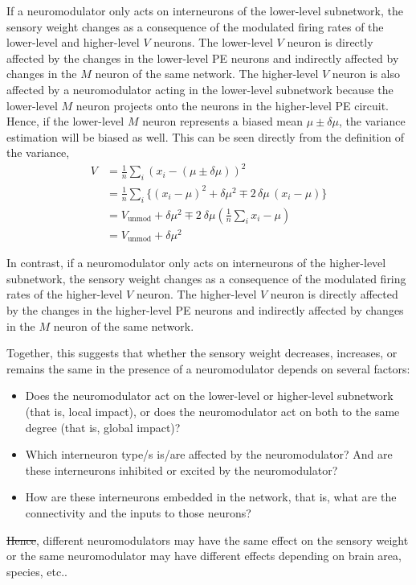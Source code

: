 \documentclass[10pt,a4paper]{article}
\providecommand{\DIFaddtex}[1]{{\protect\color{blue}\uwave{#1}}} %
\providecommand{\DIFdeltex}[1]{{\protect\color{red}\sout{#1}}}                      %
\providecommand{\DIFaddbegin}{} %
\providecommand{\DIFaddend}{} %
\providecommand{\DIFdelbegin}{} %
\providecommand{\DIFdelend}{} %
\providecommand{\DIFadd}[1]{\texorpdfstring{\DIFaddtex{#1}}{#1}} %
\providecommand{\DIFdel}[1]{\texorpdfstring{\DIFdeltex{#1}}{}} %
\newcommand{\DIFscaledelfig}{0.5}
\newlength{\DIFdelgraphicswidth} %
\newlength{\DIFdelgraphicsheight} %
\newcommand{\DIFaddincludegraphics}[2][]{{\color{blue}\fbox{\DIFOincludegraphics[#1]{#2}}}} %
\newcommand{\DIFdelincludegraphics}[2][]{%
\sbox{\DIFdelgraphicsbox}{\DIFOincludegraphics[#1]{#2}}%
\settoboxwidth{\DIFdelgraphicswidth}{\DIFdelgraphicsbox} %
\settoboxtotalheight{\DIFdelgraphicsheight}{\DIFdelgraphicsbox} %
\scalebox{\DIFscaledelfig}{%
\parbox[b]{\DIFdelgraphicswidth}{\usebox{\DIFdelgraphicsbox}\\[-\baselineskip] \rule{\DIFdelgraphicswidth}{0em}}\llap{\resizebox{\DIFdelgraphicswidth}{\DIFdelgraphicsheight}{%
\setlength{\unitlength}{\DIFdelgraphicswidth}%
\begin{picture}(1,1)%
\thicklines\linethickness{2pt} %
{\color[rgb]{1,0,0}\put(0,0){\framebox(1,1){}}}%
{\color[rgb]{1,0,0}\put(0,0){\line( 1,1){1}}}%
{\color[rgb]{1,0,0}\put(0,1){\line(1,-1){1}}}%
\end{picture}%
}\hspace*{3pt}}} %
} %
\DeclareRobustCommand{\DIFaddbegin}{\DIFOaddbegin \let\includegraphics\DIFaddincludegraphics} %
\DeclareRobustCommand{\DIFaddend}{\DIFOaddend \let\includegraphics\DIFOincludegraphics} %
\DeclareRobustCommand{\DIFdelbegin}{\DIFOdelbegin \let\includegraphics\DIFdelincludegraphics} %
\DeclareRobustCommand{\DIFdelend}{\DIFOaddend \let\includegraphics\DIFOincludegraphics} %
\begin{document}
If a neuromodulator only acts on interneurons of the lower-level subnetwork, the sensory weight changes as a consequence of the modulated firing rates of the lower-level and higher-level $V$ neurons. The lower-level $V$ neuron is directly affected by the changes in the lower-level PE neurons and indirectly affected by changes in the $M$ neuron of the same network. The higher-level $V$ neuron is also affected by a neuromodulator acting in the lower-level subnetwork because the lower-level $M$ neuron projects onto the neurons in the higher-level PE circuit. Hence, if the lower-level $M$ neuron represents a biased mean $\mu \pm \delta\mu$, the variance estimation will be biased as well. This can be seen directly from the definition of the variance,
%
\begin{align*}
V &= \frac{1}{n} \sum_i \left( x_i - \left(\mu \pm \delta\mu\right)\right)^2 \\
&= \frac{1}{n} \sum_i \lbrace  \left( x_i - \mu \right)^2 + \delta\mu^2 \mp 2\, \delta\mu\,  (x_i - \mu)\rbrace \\
&= V_\mathrm{unmod} + \delta\mu^2 \mp 2\ \delta\mu \left( \frac{1}{n} \sum_i x_i- \mu\right) \\
&= V_\mathrm{unmod} + \delta\mu^2
\end{align*}
%

In contrast, if a neuromodulator only acts on interneurons of the higher-level subnetwork, the sensory weight changes as a consequence of the modulated firing rates of the higher-level $V$ neuron. The higher-level $V$ neuron is directly affected by the changes in the higher-level PE neurons and indirectly affected by changes in the $M$ neuron of the same network.

Together, this suggests that whether the sensory weight decreases, increases, or remains the same in the presence of a neuromodulator depends on several factors:
%
\begin{itemize}
\item Does the neuromodulator act on the lower-level or higher-level subnetwork (that is, local impact), or does the neuromodulator act on both to the same degree (that is, global impact)?
\item Which interneuron type/s is/are affected by the neuromodulator? And are these interneurons inhibited or excited by the neuromodulator?
\item How are these interneurons embedded in the network, that is, what are the connectivity and the inputs to those neurons?
\end{itemize}
%
\DIFdelbegin \DIFdel{Hence}\DIFdelend \DIFaddbegin \DIFadd{As a result}\DIFaddend , different neuromodulators may have the same effect on the sensory weight or the same neuromodulator may have different effects depending on brain area, species, etc..
\end{document}
